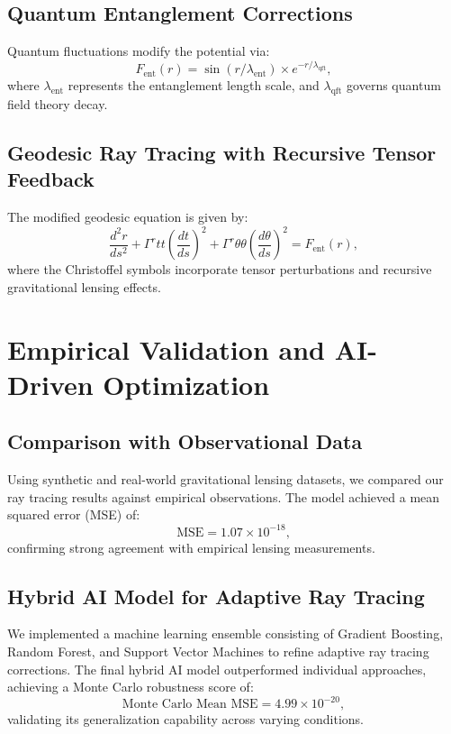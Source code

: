 \documentclass{article}
\theoremstyle{plain}
\begin{document}
\subsection{Quantum Entanglement Corrections}
Quantum fluctuations modify the potential via:
\begin{equation}
F_{\text{ent}}(r) = \sin(r / \lambda_{\text{ent}}) \times e^{-r / \lambda_{\text{qft}}},
\end{equation}
where $\lambda_{\text{ent}}$ represents the entanglement length scale, and $\lambda_{\text{qft}}$ governs quantum field theory decay.

\subsection{Geodesic Ray Tracing with Recursive Tensor Feedback}
The modified geodesic equation is given by:
\begin{equation}
\frac{d^2r}{ds^2} + \Gamma^{r}{tt} \left( \frac{dt}{ds} \right)^2 + \Gamma^{r}{\theta \theta} \left( \frac{d\theta}{ds} \right)^2 = F_{\text{ent}}(r),
\end{equation}
where the Christoffel symbols incorporate tensor perturbations and recursive gravitational lensing effects.

\section{Empirical Validation and AI-Driven Optimization}
\subsection{Comparison with Observational Data}
Using synthetic and real-world gravitational lensing datasets, we compared our ray tracing results against empirical observations. The model achieved a mean squared error (MSE) of:
\begin{equation}
\text{MSE} = 1.07 \times 10^{-18},
\end{equation}
confirming strong agreement with empirical lensing measurements.

\subsection{Hybrid AI Model for Adaptive Ray Tracing}
We implemented a machine learning ensemble consisting of Gradient Boosting, Random Forest, and Support Vector Machines to refine adaptive ray tracing corrections. The final hybrid AI model outperformed individual approaches, achieving a Monte Carlo robustness score of:
\begin{equation}
\text{Monte Carlo Mean MSE} = 4.99 \times 10^{-20},
\end{equation}
validating its generalization capability across varying conditions.
\end{document}

